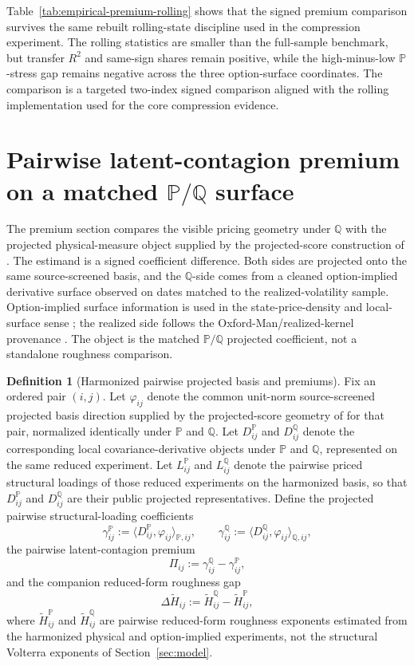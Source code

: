 \documentclass[11pt,a4paper]{amsart}
\theoremstyle{plain}
\theoremstyle{definition}
\newtheorem{definition}[theorem]{Definition}
\theoremstyle{remark}
\newcommand{\PP}{\mathbb{P}}
\newcommand{\QQ}{\mathbb{Q}}
\begin{document}
Table~\ref{tab:empirical-premium-rolling} shows that the signed premium comparison survives the
same rebuilt rolling-state discipline used in the compression experiment.  The rolling
statistics are smaller than the full-sample benchmark, but transfer \(R^2\) and same-sign shares
remain positive, while the high-minus-low \(\PP\)-stress gap remains negative across the three
option-surface coordinates.  The comparison is a targeted two-index signed comparison aligned with
the rolling implementation used for the core compression evidence.

\section{Pairwise latent-contagion premium on a matched \texorpdfstring{\(\PP/\QQ\)}{P/Q} surface}\label{sec:premium}

The premium section compares the visible pricing geometry under \(\QQ\) with the projected
physical-measure object supplied by the projected-score construction of \cite{vidal2026econometric}.
The estimand is a signed coefficient difference.  Both sides are projected onto the same
source-screened basis, and the \(\QQ\)-side comes from a cleaned option-implied derivative surface
observed on dates matched to the realized-volatility sample.  Option-implied surface information is
used in the state-price-density and local-surface sense \cite{breeden1978,dupire1994}; the realized
side follows the Oxford-Man/realized-kernel provenance \cite{heber2009realized,barndorffNielsen2008realized,
shephardSheppard2010heavy}.  The object is the
matched \(\PP/\QQ\) projected coefficient, not a standalone roughness comparison.

\begin{definition}[Harmonized pairwise projected basis and premiums]\label{def:premium}
Fix an ordered pair \((i,j)\).  Let \(\varphi_{ij}\) denote the common unit-norm source-screened
projected basis direction supplied by the projected-score geometry of
\cite{vidal2026econometric} for that pair,
normalized identically under \(\PP\) and \(\QQ\).  Let \(D_{ij}^\PP\) and \(D_{ij}^\QQ\) denote the corresponding local
covariance-derivative objects under \(\PP\) and \(\QQ\), represented on the same reduced
experiment.  Let \(L_{ij}^\PP\) and \(L_{ij}^\QQ\) denote the pairwise priced structural loadings of
those reduced experiments on the harmonized basis, so that \(D_{ij}^\PP\) and \(D_{ij}^\QQ\) are
their public projected representatives.  Define the projected pairwise structural-loading coefficients
\[
        \gamma_{ij}^\PP
        :=
        \langle D_{ij}^\PP,\varphi_{ij}\rangle_{\PP,ij},
        \qquad
        \gamma_{ij}^\QQ
        :=
        \langle D_{ij}^\QQ,\varphi_{ij}\rangle_{\QQ,ij},
\]
the pairwise latent-contagion premium
\[
        \Pi_{ij}:=\gamma_{ij}^\QQ-\gamma_{ij}^\PP,
\]
and the companion reduced-form roughness gap
\[
        \Delta \widetilde H_{ij}:=\widetilde H_{ij}^\QQ-\widetilde H_{ij}^\PP,
\]
where \(\widetilde H_{ij}^\PP\) and \(\widetilde H_{ij}^\QQ\) are pairwise reduced-form roughness
exponents estimated from the harmonized physical and option-implied experiments, not the
structural Volterra exponents of Section~\ref{sec:model}.
\end{definition}
\end{document}
